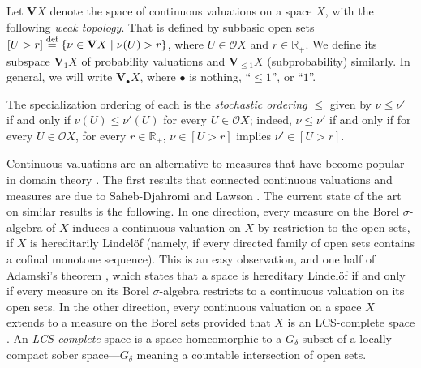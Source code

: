 \documentclass[preprint,12pt]{elsarticle}
\newcommand\eqdef{\mathrel{\buildrel \text{def}\over=}}
\newcommand{\Rp}{\mathbb{R}_+}
\newcommand\Val{{\mathbf V}}
\newcommand\Open{{\mathcal O}}
\begin{document}
Let $\Val X$ denote the space of continuous valuations on a space $X$,
with the following \emph{weak topology}.  That is defined by subbasic
open sets $[U > r] \eqdef \{\nu \in \Val X \mid \nu (U) > r\}$, where
$U \in \Open X$ and $r \in \Rp$.  We define its subspace $\Val_1 X$ of
probability valuations and $\Val_{\leq 1} X$ (subprobability)
similarly.  In general, we will write $\Val_\bullet X$, where
$\bullet$ is nothing, ``$\leq 1$'', or ``$1$''.

The specialization ordering of each is the \emph{stochastic ordering}
$\leq$ given by $\nu \leq \nu'$ if and only if $\nu (U) \leq \nu' (U)$
for every $U \in \Open X$; indeed, $\nu \leq \nu'$ if and only if for
every $U \in \Open X$, for every $r \in \Rp$, $\nu \in [U > r]$
implies $\nu' \in [U > r]$.

Continuous valuations are an alternative to measures that have become
popular in domain theory \cite{jones89,Jones:proba}.  The first
results that connected continuous valuations and measures are due to
Saheb-Djahromi \cite{saheb-djahromi:meas} and Lawson
\cite{Lawson:valuation}.  The current state of the art on similar
results is the following.  In one direction, every measure on the
Borel $\sigma$-algebra of $X$ induces a continuous valuation on $X$ by
restriction to the open sets, if $X$ is hereditarily Lindel\"of
(namely, if every directed family of open sets contains a cofinal
monotone sequence).  This is an easy observation, and one half of
Adamski's theorem \cite[Theorem~3.1]{Adamski:measures}, which states
that a space is hereditary Lindel\"of if and only if every measure on
its Borel $\sigma$-algebra restricts to a continuous valuation on its
open sets.  In the other direction, every continuous valuation on a
space $X$ extends to a measure on the Borel sets provided that $X$ is
an LCS-complete space \cite[Theorem~1]{dBGLJL:LCScomplete}.  An
\emph{LCS-complete} space is a space homeomorphic to a $G_\delta$
subset of a locally compact sober space---$G_\delta$ meaning a
countable intersection of open sets.
\end{document}
